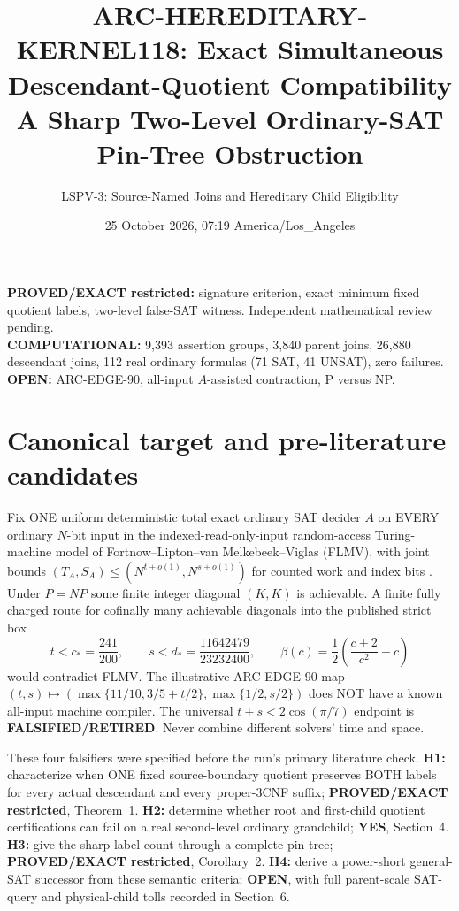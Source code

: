 \documentclass[11pt]{article}
\title{ARC-HEREDITARY-KERNEL118: Exact Simultaneous Descendant-Quotient Compatibility\\
\large A Sharp Two-Level Ordinary-SAT Pin-Tree Obstruction}
\author{LSPV-3: Source-Named Joins and Hereditary Child Eligibility}
\date{25 October 2026, 07:19 America/Los\_Angeles}
\begin{document}
\maketitle
\begin{center}
\textbf{PROVED/EXACT restricted:} signature criterion, exact minimum fixed quotient labels, two-level false-SAT witness. Independent mathematical review pending.\\
\textbf{COMPUTATIONAL:} 9,393 assertion groups, 3,840 parent joins, 26,880 descendant joins, 112 real ordinary formulas (71 SAT, 41 UNSAT), zero failures.\\
\textbf{OPEN:} ARC-EDGE-90, all-input $A$-assisted contraction, P versus NP.
\end{center}

\section{Canonical target and pre-literature candidates}
Fix ONE uniform deterministic total exact ordinary SAT decider $A$ on EVERY
ordinary $N$-bit input in the indexed-read-only-input random-access
Turing-machine model of Fortnow--Lipton--van Melkebeek--Viglas (FLMV),
with joint bounds $(T_A,S_A)\le(N^{t+o(1)},N^{s+o(1)})$
for counted work and index bits \cite{flmv}. Under $P=NP$ some finite
integer diagonal $(K,K)$ is achievable. A finite fully charged route
for cofinally many achievable diagonals into the published strict box
\[
  t< c_*=\frac{241}{200},\qquad
  s<d_*=\frac{11642479}{23232400},\qquad
  \beta(c)=\frac12\left(\frac{c+2}{c^2}-c\right)
\]
would contradict FLMV. The illustrative ARC-EDGE-90 map
$(t,s)\mapsto(\max\{11/10,3/5+t/2\},\max\{1/2,s/2\})$
does NOT have a known all-input machine compiler. The universal
$t+s<2\cos(\pi/7)$ endpoint is \textbf{FALSIFIED/RETIRED}.
Never combine different solvers' time and space.

These four falsifiers were specified before the run's primary literature
check. \textbf{H1:} characterize when ONE fixed source-boundary quotient
preserves BOTH labels for every actual descendant and every proper-3CNF
suffix; \textbf{PROVED/EXACT restricted}, Theorem~1.
\textbf{H2:} determine whether root and first-child quotient certifications
can fail on a real second-level ordinary grandchild; \textbf{YES},
Section~4. \textbf{H3:} give the sharp label count through a complete
pin tree; \textbf{PROVED/EXACT restricted}, Corollary~2.
\textbf{H4:} derive a power-short general-SAT successor from these
semantic criteria; \textbf{OPEN}, with full parent-scale SAT-query and
physical-child tolls recorded in Section~6.
\end{document}
